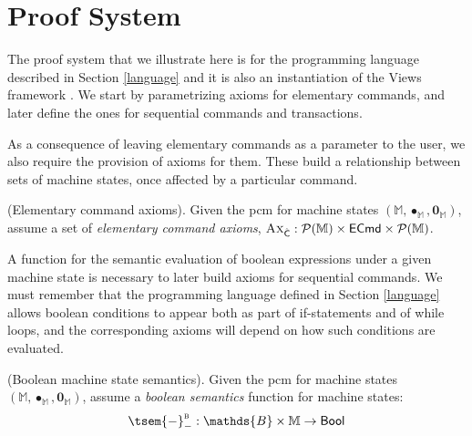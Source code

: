 \section{Proof System}

The proof system that we illustrate here is for the programming language described in Section \ref{language} and it is also an instantiation of the Views framework \cite{views}. We start by parametrizing axioms for elementary commands, and later define the ones for sequential commands and transactions.

As a consequence of leaving elementary commands as a parameter to the user, we also require the provision of axioms for them. These build a relationship between sets of machine states, once affected by a particular command.
\begin{param}
	\label{param:ecmdAx}
	(Elementary command axioms).
	Given the pcm for machine states $(\mathbb{M}, \bullet_\mathbb{M}, \mathbf{0}_\mathbb{M})$, assume a set of \emph{elementary command axioms}, $\textsc{Ax}_{\hat{\mathsf{C}}} : \mathcal{P}(\mathbb{M}) \times \mathsf{ECmd} \times \mathcal{P}(\mathbb{M})$.
\end{param}

A function for the semantic evaluation of boolean expressions under a given machine state is necessary to later build axioms for sequential commands. We must remember that the programming language defined in Section \ref{language} allows boolean conditions to appear both as part of if-statements and of while loops, and the corresponding axioms will depend on how such conditions are evaluated.
\begin{param}
	\label{param:boolMachine}
	(Boolean machine state semantics).
	Given the pcm for machine states $(\mathbb{M}, \bullet_\mathbb{M}, \mathbf{0}_\mathbb{M})$, assume a \emph{boolean semantics} function for machine states:
	\[
		\tsem{-}^\textsc{b}_- : \mathds{B} \times \mathbb{M} \rightarrow \mathsf{Bool}
	\]
\end{param}

